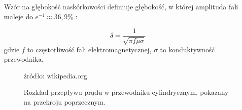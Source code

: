 Wzór na głębokość naskórkowości definiuje głębokość, w której amplituda fali maleje do $e^{-1} \approx 36,9\% $ \cite{schmitt2002electromagnetics}: 

\begin{equation}
    \delta = \frac{1}{\sqrt{\pi f \mu \sigma}}
    \label{eq:skin_effect}
\end{equation}
gdzie $f$ to częstotliwość fali elektromagnetycznej, $\sigma$ to konduktywność przewodnika.

\begin{figure}[H]
    \begin{center}
        
    \end{center}
    \caption{Rozkład przepływu prądu w przewodniku cylindrycznym, pokazany na przekroju poprzecznym.}
    \label{fig:skin_effect}
    \hfill\small źródło: wikipedia.org \cite{skin_effect_svg} 
\end{figure}

